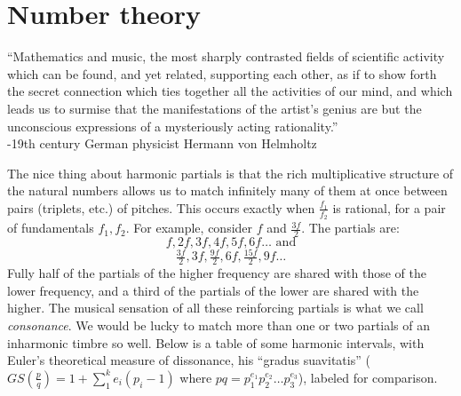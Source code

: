 \documentclass[12pt]{article}
\begin{document}
\section{Number theory}
\par
``Mathematics and music, the most sharply contrasted fields of scientific activity which can be found, and yet related, supporting each other, as if to show forth the secret connection which ties together all the activities of our mind, and which leads us to surmise that the manifestations of the artist's genius are but the unconscious expressions of a mysteriously acting rationality.'' \\
-19th century German physicist Hermann von Helmholtz
\\
\par
The nice thing about harmonic partials is that the rich multiplicative structure of the natural numbers allows us to match infinitely many of them at once between pairs (triplets, etc.) of pitches.  This occurs exactly when $\tfrac{f_1}{f_2}$ is rational, for a pair of fundamentals $f_1,f_2$.  For example, consider $f$ and $\tfrac{3f}{2}$.  The partials are:
\[f,2f,3f,4f,5f,6f\ldots \text{ and} \]
\[\tfrac{3f}{2},3f,\tfrac{9f}{2},6f,\tfrac{15f}{2},9f\ldots\]
Fully half of the partials of the higher frequency are shared with those of the lower frequency, and a third of the partials of the lower are shared with the higher.  The musical sensation of all these reinforcing partials is what we call \emph{consonance}.  We would be lucky to match more than one or two partials of an inharmonic timbre so well.  Below is a table of some harmonic intervals, with Euler's theoretical measure of dissonance, his ``gradus suavitatis'' ($GS(\frac{p}{q})=1+\sum_1^k{e_i(p_i-1)}$ where $pq=p_1^{e_1}p_2^{e_2}\ldots p_3^{e_3}$), labeled for comparison.\\
\end{document}
